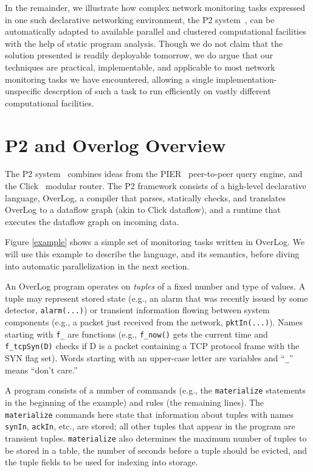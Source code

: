 \documentclass[10pt,twocolumn]{MyTightStyle}
\newcommand{\ol}[1]{{\tt\footnotesize#1}}
\begin{document}
In the remainder, we illustrate how complex network monitoring tasks expressed in one
such  declarative networking environment, the P2 system~\cite{loo05},
can be automatically adapted to available parallel and clustered
computational facilities with the help of static program analysis. Though
we do not claim that the solution presented is readily deployable
tomorrow, we do argue that our techniques are practical, implementable,
and applicable to most network monitoring tasks we have encountered,
allowing a single implementation-unspecific descrption of such a task
to run efficiently on vastly different computational facilities.





\section{P2 and Overlog Overview}


The P2 system~\cite{loo05} combines ideas from the PIER~\cite{huebsch03}
peer-to-peer query engine, and the Click~\cite{kohler00} modular
router. The P2 framework consists of a high-level declarative language,
OverLog, a compiler that parses, statically checks, and translates
OverLog to a dataflow graph (akin to Click dataflow), and a runtime that
executes the dataflow graph on incoming data.

Figure \ref{example} shows a simple set of  monitoring tasks  written in
OverLog. We will use this example to describe the language, and its
semantics, before diving into automatic parallelization in the next
section.

An OverLog program operates on \emph{tuples} of a fixed number and type
of values. A tuple may represent stored state (e.g., an alarm that was
recently issued by some detector, \ol{alarm(...)}) or transient information flowing
between system components (e.g., a packet just received from the
network, \ol{pktIn(...)}). Names starting with \ol{f\_} are
functions (e.g., \ol{f\_now()} gets the current time and \ol{f\_tcpSyn(D)}
checks if D is a packet containing a TCP protocol frame with the SYN
flag set). Words starting with an upper-case letter are variables and
``\ol{\_}'' means ``don't care.''

A program consists of a number of commands (e.g., the
\ol{materialize} statements in the beginning of the example) and rules
(the remaining lines). The \ol{materialize} commands here state that
information about tuples with names \ol{synIn}, \ol{ackIn},
etc., are stored; all other
tuples that appear in the program are transient tuples. \ol{materialize}
also determines the maximum number of tuples to be stored in a table,
the number of seconds before a tuple should be evicted, and the tuple
fields to be used for indexing into storage.
\end{document}
